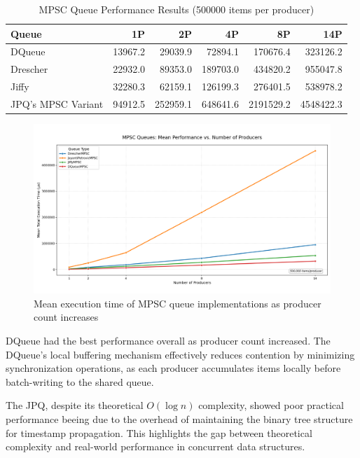 \begin{table}[htb]
\centering
\caption{\ac{MPSC} Queue Performance Results (500000 items per producer)}
\label{tab:mpsc-results}
\begin{tabular}{@{}lrrrrr@{}}
\toprule
Queue & 1P & 2P & 4P & 8P & 14P \\
\midrule
DQueue & 13967.2 & 29039.9 & 72894.1 & 170676.4 & 323126.2 \\
Drescher & 22932.0 & 89353.0 & 189703.0 & 434820.2 & 955047.8 \\
Jiffy & 32280.3 & 62159.1 & 126199.3 & 276401.5 & 538978.2 \\
\ac{JPQ}'s \ac{MPSC} Variant & 94912.5 & 252959.1 & 648641.6 & 2191529.2 & 4548422.3 \\
\bottomrule
\end{tabular}
\end{table}

\begin{figure}[htb]
\centering
\caption{Mean execution time of MPSC queue implementations as producer count increases}
\label{fig:mpsc-mean-performance}
\includegraphics[width=\textwidth]{images/results/mpsc_mean_performance_vs_producers.png}
\end{figure}

DQueue had the best performance overall as producer count increased. The DQueue's local buffering mechanism effectively reduces contention by minimizing synchronization operations, as each producer accumulates items locally before batch-writing to the shared queue.

The \ac{JPQ}, despite its theoretical $O(\log n)$ complexity, showed poor practical performance  beeing due to the overhead of maintaining the binary tree structure for timestamp propagation. This highlights the gap between theoretical complexity and real-world performance in concurrent data structures.

